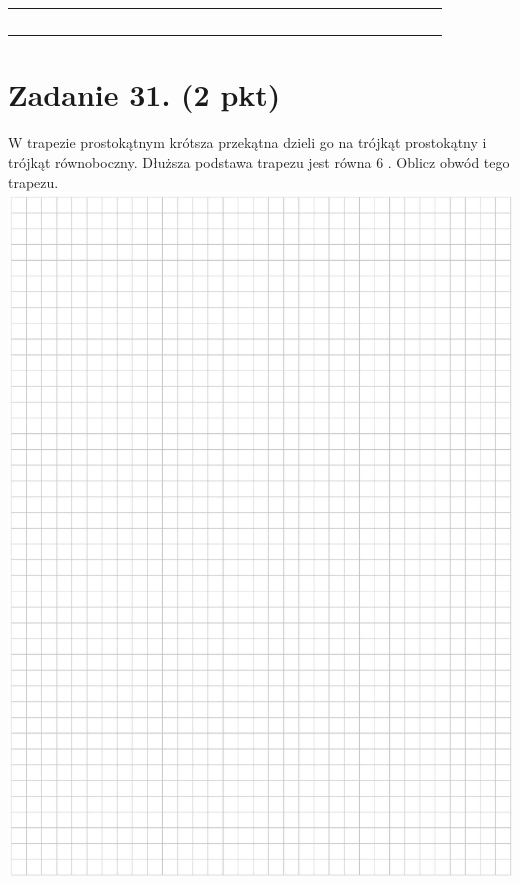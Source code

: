 \documentclass[10pt]{article}
\begin{document}
\begin{center}
\begin{tabular}{|c|c|c|c|c|c|c|c|c|c|c|c|c|c|c|c|c|c|c|c|c|c|c|c|c|c|c|c|c|c|c|}
\hline
 &  &  &  &  &  &  &  &  &  &  &  &  &  &  &  &  &  &  &  &  &  &  &  &  &  &  &  &  &  &  \\
\hline
 &  &  &  &  &  &  &  &  &  &  &  &  &  &  &  &  &  &  &  &  &  &  &  &  &  &  &  &  &  &  \\
\hline
 &  &  &  &  &  &  &  &  &  &  &  &  &  &  &  &  &  &  &  &  &  &  &  &  &  &  &  &  &  &  \\
\hline
 &  &  &  &  &  &  &  &  &  &  &  &  &  &  &  &  &  &  &  &  &  &  &  &  &  &  &  &  &  &  \\
\hline
 &  &  &  &  &  &  &  &  &  &  &  &  &  &  &  &  &  &  &  &  &  &  &  &  &  &  &  &  &  &  \\
\hline
 &  &  &  &  &  &  &  &  &  &  &  &  &  &  &  &  &  &  &  &  &  &  &  &  &  &  &  &  &  &  \\
\hline
\end{tabular}
\end{center}

\section*{Zadanie 31. (2 pkt)}
W trapezie prostokątnym krótsza przekątna dzieli go na trójkąt prostokątny i trójkąt równoboczny. Dłuższa podstawa trapezu jest równa 6 . Oblicz obwód tego trapezu.\\
\includegraphics[max width=\textwidth, center]{2024_11_21_caf6b2e64dd65c9b24eeg-13}
\end{document}
